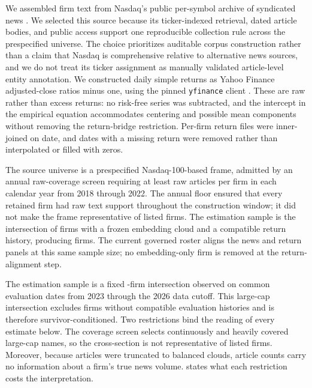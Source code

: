 We assembled firm text from Nasdaq's public per-symbol archive of syndicated
news \citep{nasdaq_news_headlines_2026}.
We selected this source because its ticker-indexed retrieval, dated article
bodies, and public access support one reproducible collection rule across the
prespecified universe.
The choice prioritizes auditable corpus construction rather than a claim that
Nasdaq is comprehensive relative to alternative news sources, and we do not
treat its ticker assignment as manually validated article-level entity
annotation.
We constructed daily simple returns as Yahoo Finance adjusted-close ratios
minus one, using the pinned \texttt{yfinance} client
\citep{yahoo_finance_historical_2026,aroussi_yfinance_2026}.
These are raw rather than excess returns: no risk-free series was subtracted,
and the intercept in the empirical equation accommodates centering and possible
mean components without removing the return-bridge restriction.
Per-firm return files were inner-joined on date, and dates with a missing return
were removed rather than interpolated or filled with zeros.

The source universe is a prespecified Nasdaq-100-based frame, admitted by an
annual raw-coverage screen requiring at least
 raw articles per firm in each calendar year
from 2018 through 2022.
The annual floor ensured that every retained firm had raw text support
throughout the construction window; it did not make the frame representative of
listed firms.
The estimation sample is the intersection of firms with a frozen embedding
cloud and a compatible return history, producing
 firms.
The current governed roster aligns the news and return panels at this same
sample size; no embedding-only firm is removed at the return-alignment step.

The estimation sample is a fixed -firm intersection
observed on  common
evaluation dates from 2023 through the 2026 data cutoff.
This large-cap intersection excludes firms without compatible evaluation
histories and is therefore survivor-conditioned.
Two restrictions bind the reading of every estimate below.
The coverage screen selects continuously and heavily covered large-cap names,
so the cross-section is not representative of listed firms.
Moreover, because articles were truncated to balanced clouds, article counts
carry no information about a firm's true news volume.
 states what each restriction costs the interpretation.

